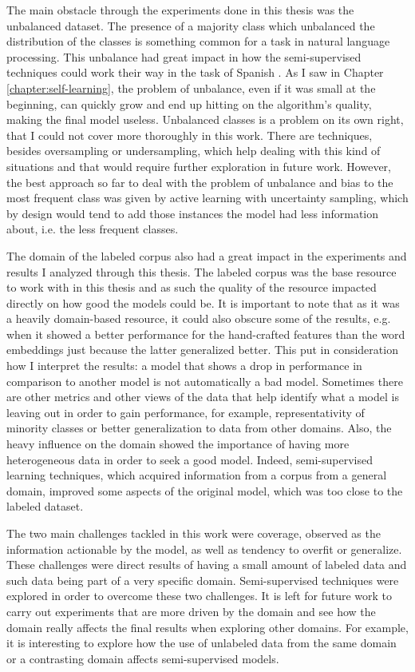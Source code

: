 The main obstacle through the experiments done in this thesis was the
unbalanced dataset. The presence of a majority class which unbalanced the
distribution of the classes is something common for a task in natural language
processing. This unbalance had great impact in how the semi-supervised
techniques could work their way in the task of Spanish \vsd. As I saw in
Chapter \ref{chapter:self-learning}, the problem of unbalance, even if it was
small at the beginning, can quickly grow and end up hitting on the algorithm's
quality, making the final model useless. Unbalanced classes is a problem on its
own right, that I could not cover more thoroughly in this work.  There are
techniques, besides oversampling or undersampling, which help dealing with this
kind of situations and that would require further exploration in future work.
However, the best approach so far to deal with the problem of unbalance and
bias to the most frequent class was given by active learning with uncertainty
sampling, which by design would tend to add those instances the model had less
information about, i.e. the less frequent classes.

The domain of the labeled corpus also had a great impact in the experiments and
results I analyzed through this thesis. The labeled corpus was the base
resource to work with in this thesis and as such the quality of the resource
impacted directly on how good the models could be. It is important to note that
as it was a heavily domain-based resource, it could also obscure some of the
results, e.g. when it showed a better performance for the hand-crafted features
than the word embeddings just because the latter generalized better. This put
in consideration how I interpret the results: a model that shows a drop in
performance in comparison to another model is not automatically a bad model.
Sometimes there are other metrics and other views of the data that help
identify what a model is leaving out in order to gain performance, for example,
representativity of minority classes or better generalization to data from
other domains. Also, the heavy influence on the domain showed the importance of
having more heterogeneous data in order to seek a good model. Indeed,
semi-supervised learning techniques, which acquired information from a corpus
from a general domain, improved some aspects of the original model, which was
too close to the labeled dataset.

The two main challenges tackled in this work were coverage, observed as the
information actionable by the model, as well as tendency to overfit or
generalize. These challenges were direct results of having a small amount of
labeled data and such data being part of a very specific domain.
Semi-supervised techniques were explored in order to overcome these two
challenges. It is left for future work to carry out experiments that are more
driven by the domain and see how the domain really affects the final results
when exploring other domains. For example, it is interesting to explore how the
use of unlabeled data from the same domain or a contrasting domain affects
semi-supervised models.

